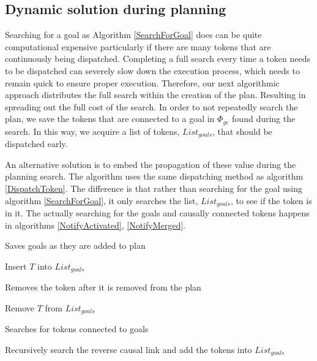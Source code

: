 \subsection{Dynamic solution during planning}

Searching for a goal as Algorithm \ref{SearchForGoal} does can be
quite computational expensive particularly if there are many tokens
that are continuously being dispatched. Completing a full search every
time a token needs to be dispatched can severely slow down the
execution process, which needs to remain quick to ensure proper
execution. Therefore, our next algorithmic approach distributes the
full search within the creation of the plan.  Resulting in spreading
out the full cost of the search. In order to not repeatedly search the
plan, we save the tokens that are connected to a goal in $\Phi_{ge}$
found during the search. In this way, we acquire a list of tokens,
$List_{goals}$, that should be dispatched early.

An alternative solution is to embed the propagation of these value
during the planning search. The algorithm uses the same dispatching
method as algorithm \ref{DispatchToken}.  The difference is that
rather than searching for the goal using algorithm
\ref{SearchForGoal}, it only searches the list, $List_{goals}$, to see
if the token is in it. The actually searching for the goals and
causally connected tokens happens in algorithms \ref{NotifyActivated},
\ref{NotifyMerged}.

\begin{algorithm}
\caption{Saves goals as they are added to plan}
\label{NotifyAdded}
\begin{algorithmic}
	\State Insert $T$ into $List_{goals}$
\EndIf 
\EndFunction
\end{algorithmic}
\end{algorithm}

\begin{algorithm}
\caption{Removes the token after it is removed from the plan}
\label{NotifyRemoved}
\begin{algorithmic}
	\State Remove $T$ from $List_{goals}$
\EndFunction
\end{algorithmic}
\end{algorithm}

\begin{algorithm}
\caption{Searches for tokens connected to goals}
\label{NotifyActivated}
\begin{algorithmic}
	\State Recursively search the reverse causal link and add the tokens into $List_{goals}$
\EndIf
\EndFunction
\end{algorithmic}
\end{algorithm}

